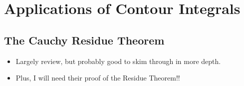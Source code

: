 \documentclass[../finalProject.tex]{subfiles}
\begin{document}
\section{Applications of Contour Integrals}\label{sch:8}
\subsection{The Cauchy Residue Theorem}
\begin{itemize}
    \item {}Largely review, but probably good to skim through in more depth.
    \item Plus, I will need their proof of the Residue Theorem!!
\end{itemize}
\end{document}
